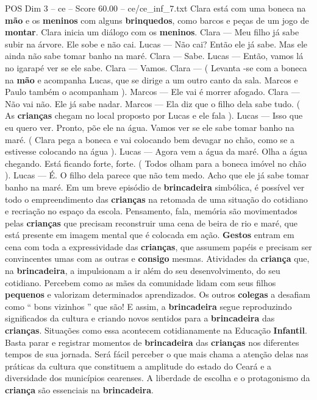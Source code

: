 \begin{textsample}{POS Dim 3 – ce – Score 60.00 – ce/ce\_inf\_7.txt}
Clara está com uma boneca na \textbf{mão} e os \textbf{meninos} com alguns \textbf{brinquedos}, como barcos e peças de um jogo de \textbf{montar}.
Clara inicia um diálogo com os \textbf{meninos}.
Clara — Meu filho já sabe subir na árvore.
Ele sobe e não cai.
Lucas — Não cai?
Então ele já sabe.
Mas ele ainda não sabe tomar banho na maré.
Clara — Sabe.
Lucas — Então, vamos lá no igarapé ver se ele sabe.
Clara — Vamos.
Clara — ( Levanta -se com a boneca na \textbf{mão} e acompanha Lucas, que se dirige a um outro canto da sala.
Marcos e Paulo também o acompanham ).
Marcos — Ele vai é morrer afogado.
Clara — Não vai não.
Ele já sabe nadar.
Marcos — Ela diz que o filho dela sabe tudo. ( As \textbf{crianças} chegam no local proposto por Lucas e ele fala ).
Lucas — Isso que eu quero ver.
Pronto, põe ele na água.
Vamos ver se ele sabe tomar banho na maré. ( Clara pega a boneca e vai colocando bem devagar no chão, como se a estivesse colocando na água ).
Lucas — Agora vem a água da maré.
Olha a água chegando.
Está ficando forte, forte. ( Todos olham para a boneca imóvel no chão ).
Lucas — É.
O filho dela parece que não tem medo.
Acho que ele já sabe tomar banho na maré.
Em um breve episódio de \textbf{brincadeira} simbólica, é possível ver todo o empreendimento das \textbf{crianças} na retomada de uma situação do cotidiano e recriação no espaço da escola.
Pensamento, fala, memória são movimentados pelas \textbf{crianças} que precisam reconstruir uma cena de beira de rio e maré, que está presente em imagem mental que é colocada em ação. \textbf{Gestos} entram em cena com toda a expressividade das \textbf{crianças}, que assumem papéis e precisam ser convincentes umas com as outras e \textbf{consigo} mesmas.
Atividades da \textbf{criança} que, na \textbf{brincadeira}, a impulsionam a ir além do seu desenvolvimento, do seu cotidiano.
Percebem como as mães da comunidade lidam com seus filhos \textbf{pequenos} e valorizam determinados aprendizados.
Os outros \textbf{colegas} a desafiam como “ bons vizinhos ” que são!
E assim, a \textbf{brincadeira} segue reproduzindo significados da cultura e criando novos sentidos para a \textbf{brincadeira} das \textbf{crianças}.
Situações como essa acontecem cotidianamente na Educação \textbf{Infantil}.
Basta parar e registrar momentos de \textbf{brincadeira} das \textbf{crianças} nos diferentes tempos de sua jornada.
Será fácil perceber o que mais chama a atenção delas nas práticas da cultura que constituem a amplitude do estado do Ceará e a diversidade dos municípios cearenses.
A liberdade de escolha e o protagonismo da \textbf{criança} são essenciais na \textbf{brincadeira}.

\end{textsample}
